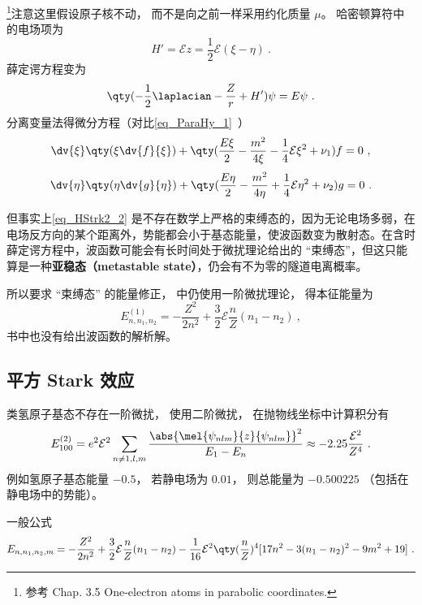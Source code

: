 
\begin{issues}
\issueDraft
\end{issues}


\footnote{参考 \cite{Bransden} Chap. 3.5 One-electron atoms in parabolic coordinates.}注意这里假设原子核不动， 而不是向之前一样采用约化质量 $\mu$。 哈密顿算符中的电场项为
\begin{equation}\label{eq_HStrk2_1}
H' = \mathcal Ez = \frac12 \mathcal E (\xi - \eta)~.
\end{equation}
薛定谔方程变为
\begin{equation}\label{eq_HStrk2_2}
\qty(-\frac12 \laplacian - \frac{Z}{r} + H')\psi = E\psi~.
\end{equation}
分离变量法得微分方程（对比\autoref{eq_ParaHy_1}~）
\begin{equation}
\dv{\xi} \qty(\xi \dv{f}{\xi}) + \qty(\frac{E \xi}{2} - \frac{m^2}{4\xi} -\frac14\mathcal E \xi^2 + \nu_1) f = 0~,
\end{equation}
\begin{equation}
\dv{\eta}\qty(\eta \dv{g}{\eta}) + \qty(\frac{E\eta}{2} - \frac{m^2}{4\eta} +\frac14\mathcal E \eta^2 + \nu_2)g = 0~.
\end{equation}

但事实上\autoref{eq_HStrk2_2} 是不存在数学上严格的束缚态的，因为无论电场多弱，在电场反方向的某个距离外，势能都会小于基态能量，使波函数变为散射态。在含时薛定谔方程中，波函数可能会有长时间处于微扰理论给出的 “束缚态”，但这只能算是一种\textbf{亚稳态（metastable state）}，仍会有不为零的隧道电离概率。

所以要求 “束缚态” 的能量修正，\cite{Bransden} 中仍使用一阶微扰理论， 得本征能量为
\begin{equation}
E_{n,n_1,n_2}^{(1)} = -\frac{Z^2}{2n^2} + \frac32 \mathcal E \frac{n}{Z}(n_1 - n_2)~,
\end{equation}
书中也没有给出波函数的解析解。

\subsection{平方 Stark 效应}
类氢原子基态不存在一阶微扰， 使用二阶微扰， 在抛物线坐标中计算积分有
\begin{equation}
E_{100}^{(2)} = e^2\mathcal E^2 \sum_{n\ne 1, l, m} \frac{\abs{\mel{\psi_{nlm}}{z}{\psi_{nlm}}}^2}{E_1 - E_n}
\approx - 2.25\frac{\mathcal E^2}{Z^4}~.
\end{equation}
例如氢原子基态能量 $-0.5$， 若静电场为 $0.01$， 则总能量为 $-0.500225$ （包括在静电场中的势能）。

一般公式
\begin{equation}
E_{n,n_1,n_2,m} = -\frac{Z^2}{2n^2} + \frac32 \mathcal E \frac{n}{Z} (n_1-n_2)
-\frac{1}{16}\mathcal E^2 \qty(\frac{n}{Z})^4 [17n^2-3(n_1-n_2)^2-9m^2+19]~.
\end{equation}
